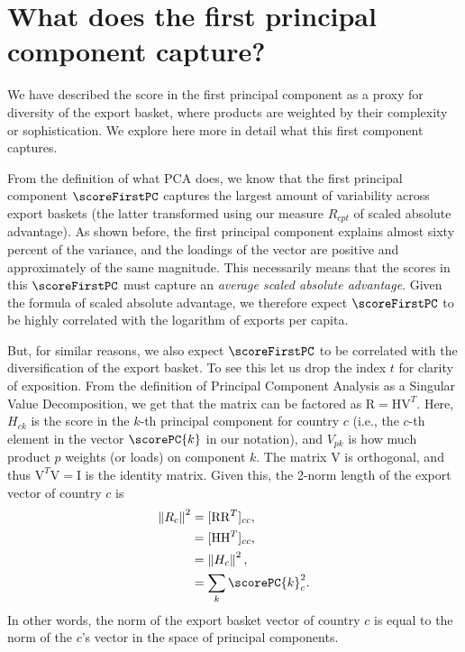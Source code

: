 \section{What does the first principal component capture?}
We have described the score in the first principal component as a proxy for diversity of the export basket, where products are weighted by their complexity or sophistication. We explore here more in detail what this first component captures.

From the definition of what PCA does, we know that the first principal component $\scoreFirstPC$ captures the largest amount of variability across export baskets (the latter transformed using our measure $R_{cpt}$ of scaled absolute advantage). As shown before, the first principal component explains almost sixty percent of the variance, and the loadings of the vector are positive and approximately of the same magnitude. This necessarily means that the scores in this $\scoreFirstPC$ must capture an \emph{average scaled absolute advantage}. Given the formula of scaled absolute advantage, we therefore expect $\scoreFirstPC$ to be highly correlated with the logarithm of exports per capita.

But, for similar reasons, we also expect $\scoreFirstPC$ to be correlated with the diversification of the export basket. To see this let us drop the index $t$ for clarity of exposition. From the definition of Principal Component Analysis as a Singular Value Decomposition, we get that the matrix can be factored as $\mathrm{R}=\mathrm{H}\mathrm{V}^T$. Here, $H_{ck}$ is the score in the $k$-th principal component for country $c$ (i.e., the $c$-th element in the vector $\scorePC{k}$ in our notation), and $V_{pk}$ is how much product $p$ weights (or loads) on component $k$. The matrix $\mathrm{V}$ is orthogonal, and thus $\mathrm{V}^T\mathrm{V}=\mathrm{I}$ is the identity matrix. Given this, the 2-norm length of the export vector of country $c$ is 
\begin{align*}
	\left\|R_c\right\|^2 &= [\mathrm{R}\mathrm{R}^T]_{cc}, \\
	&= [\mathrm{H}\mathrm{H}^T]_{cc}, \\
	&= \left\|H_c\right\|^2, \\
	&= \sum_k \scorePC{k}^2_c.
\end{align*}
In other words, the norm of the export basket vector of country $c$ is equal to the norm of the $c$'s vector in the space of principal components. 

